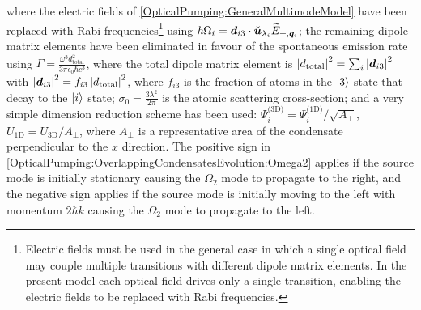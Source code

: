 where the electric fields of \eqref{OpticalPumping:GeneralMultimodeModel} have been replaced with Rabi frequencies\footnote{Electric fields must be used in the general case in which a single optical field may couple multiple transitions with different dipole matrix elements.  In the present model each optical field drives only a single transition, enabling the electric fields to be replaced with Rabi frequencies.} using $\hbar \Omega_i = \bm{d}_{i 3} \cdot \check{\bm{u}}_{\lambda_i} \widetilde{E}_{+, \bm{q}_i}$; the remaining dipole matrix elements have been eliminated in favour of the spontaneous emission rate using $\displaystyle \Gamma = \frac{\omega^3 d_\text{total}^2}{3 \pi \epsilon_0 \hbar c^3}$, where the total dipole matrix element is $\left|d_\text{total}\right|^2 = \sum_{i} \left|\bm{d}_{i3}\right|^2$ with $\left|\bm{d}_{i3}\right|^2 = f_{i3} \left|d_\text{total}\right|^2$, where $f_{i3}$ is the fraction of atoms in the ${\left|3\right>}$ state that decay to the ${\left|i\right>}$ state; $\displaystyle\sigma_0 = \frac{3 \lambda^2}{2 \pi}$ is the atomic scattering cross-section; and a very simple dimension reduction scheme has been used: $\Psi_i^\text{(3D)} = \Psi_i^\text{(1D)} / \sqrt{A_\perp}$, $U_\text{1D} = U_\text{3D} / A_\perp$, where $A_\perp$ is a representative area of the condensate perpendicular to the $x$ direction.  The positive sign in \eqref{OpticalPumping:OverlappingCondensatesEvolution:Omega2} applies if the source mode is initially stationary causing the $\Omega_2$ mode to propagate to the right, and the negative sign applies if the source mode is initially moving to the left with momentum $2 \hbar k$ causing the $\Omega_2$ mode to propagate to the left.

